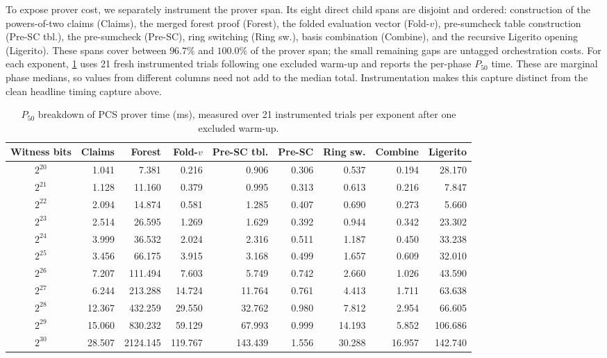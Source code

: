 To expose prover cost, we separately instrument the prover span.  Its eight
direct child spans are disjoint and ordered: construction of the powers-of-two
claims (Claims), the merged forest proof (Forest), the folded evaluation vector
(Fold-$v$), pre-sumcheck table construction (Pre-SC tbl.), the pre-sumcheck
(Pre-SC), ring switching (Ring sw.), basis combination (Combine), and the
recursive Ligerito opening (Ligerito).  These spans cover between $96.7\%$ and
$100.0\%$ of the prover span; the small remaining gaps are untagged orchestration
costs.  For each exponent, \cref{tab:f2z-pcs-prover-breakdown} uses 21 fresh
instrumented trials following one excluded warm-up and reports the per-phase
$P_{50}$ time.  These are marginal phase medians, so values from different
columns need not add to the median total.  Instrumentation makes this capture
distinct from the clean headline timing capture above.

\begin{table}[H]
  \centering
  \small
  \setlength{\tabcolsep}{3.5pt}
  \caption{$P_{50}$ breakdown of \ftwoz PCS prover time (ms), measured over 21
    instrumented trials per exponent after one excluded warm-up.}
  \label{tab:f2z-pcs-prover-breakdown}
  \begin{adjustbox}{max width=\textwidth}
  \begin{tabular}{@{}c r r r r r r r r@{}}
    \toprule
    Witness bits & Claims & Forest & Fold-$v$ & Pre-SC tbl.
      & Pre-SC & Ring sw. & Combine & Ligerito \\
    \midrule
    $2^{20}$ &  1.041 &    7.381 &   0.216 &   0.906 & 0.306 &  0.537 &  0.194 &  28.170 \\
    $2^{21}$ &  1.128 &   11.160 &   0.379 &   0.995 & 0.313 &  0.613 &  0.216 &   7.847 \\
    $2^{22}$ &  2.094 &   14.874 &   0.581 &   1.285 & 0.407 &  0.690 &  0.273 &   5.660 \\
    $2^{23}$ &  2.514 &   26.595 &   1.269 &   1.629 & 0.392 &  0.944 &  0.342 &  23.302 \\
    $2^{24}$ &  3.999 &   36.532 &   2.024 &   2.316 & 0.511 &  1.187 &  0.450 &  33.238 \\
    $2^{25}$ &  3.456 &   66.175 &   3.915 &   3.168 & 0.499 &  1.657 &  0.609 &  32.010 \\
    $2^{26}$ &  7.207 &  111.494 &   7.603 &   5.749 & 0.742 &  2.660 &  1.026 &  43.590 \\
    $2^{27}$ &  6.244 &  213.288 &  14.724 &  11.764 & 0.761 &  4.413 &  1.711 &  63.638 \\
    $2^{28}$ & 12.367 &  432.259 &  29.550 &  32.762 & 0.980 &  7.812 &  2.954 &  66.605 \\
    $2^{29}$ & 15.060 &  830.232 &  59.129 &  67.993 & 0.999 & 14.193 &  5.852 & 106.686 \\
    $2^{30}$ & 28.507 & 2124.145 & 119.767 & 143.439 & 1.556 & 30.288 & 16.957 & 142.740 \\
    \bottomrule
  \end{tabular}
  \end{adjustbox}
\end{table}

\FloatBarrier

